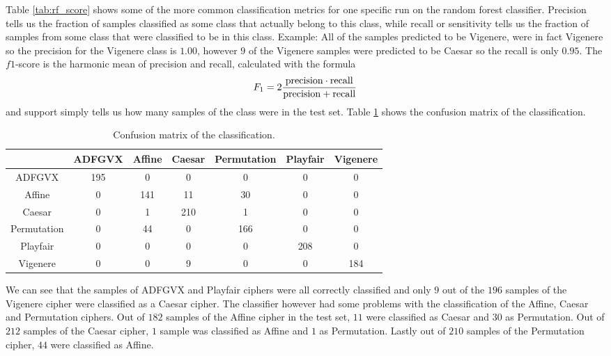\documentclass[a4paper]{article}
\begin{document}
Table \ref{tab:rf_score} shows some of the more common classification metrics for one specific run on the random forest classifier. Precision tells us the fraction of samples classified as some class that actually belong to this class, while recall or sensitivity tells us the fraction of samples from some class that were classified to be in this class. Example: All of the samples predicted to be Vigenere, were in fact Vigenere so the precision for the Vigenere class is $1.00$, however $9$ of the Vigenere samples were predicted to be Caesar so the recall is only $0.95$. The $f1$-score is the harmonic mean of precision and recall, calculated with the formula 
$$F_{1} = 2 \frac{\rm{precision} \cdot \rm{recall}}{\rm{precision} + \rm{recall}}$$ and support simply tells us how many samples of the class were in the test set. Table \ref{tab:conf_matrix} shows the confusion matrix of the classification.

\begin{table}[H]
  \begin{center}
    \begin{tabular}{| c | c | c | c | c | c | c |}
      \hline
      				&ADFGVX &Affine &Caesar &Permutation &Playfair &Vigenere\\
      \hline
      ADFGVX		&195	&0		&0	    &0			 &0		   &0\\
      \hline
      Affine		&0		&141	&11	    &30 		 &0 	   &0\\
      \hline
      Caesar      	&0		&1		&210	&1	 		 &0 	   &0\\
      \hline
      Permutation   &0		&44		&0		&166 		 &0		   &0\\
      \hline
      Playfair      &0		&0		&0		&0	 		 &208 	   &0\\
      \hline
      Vigenere      &0	    &0		&9		&0	 		 &0 	   &184\\
      \hline
    \end{tabular}
  \end{center}
  \caption{Confusion matrix of the classification.}
  \label{tab:conf_matrix}
\end{table}

We can see that the samples of ADFGVX and Playfair ciphers were all correctly classified and only $9$ out of the $196$ samples of the Vigenere cipher were classified as a Caesar cipher. The classifier however had some problems with the classification of the Affine, Caesar and Permutation ciphers. Out of $182$ samples of the Affine cipher in the test set, $11$ were classified as Caesar and $30$ as Permutation. Out of $212$ samples of the Caesar cipher, $1$ sample was classified as Affine and $1$ as Permutation. Lastly out of $210$ samples of the Permutation cipher, $44$ were classified as Affine.
\end{document}
